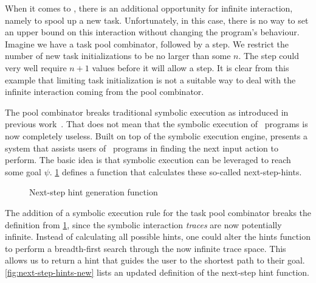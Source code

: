 When it comes to \DYNTOPHAT, there is an additional opportunity for infinite interaction, namely to spool up a new task.
Unfortunately, in this case, there is no way to set an upper bound on this interaction without changing the program's behaviour.
Imagine we have a task pool combinator, followed by a step.
We restrict the number of new task initializations to be no larger than some $n$.
The step could very well require $n+1$ values before it will allow a step.
It is clear from this example that limiting task initialization is not a suitable way to deal with the infinite interaction coming from the pool combinator.

The pool combinator breaks traditional symbolic execution as introduced in previous work~\cite{conf/ifl/NausSK19}.
That does not mean that the symbolic execution of \DYNTOPHAT\ programs is now completely useless.
Built on top of the symbolic execution engine, \citet{conf/sfp/NausS20} presents a system that assists users of \TOPHAT\ programs in finding the next input action to perform.
The basic idea is that symbolic execution can be leveraged to reach some goal $\psi$.
\cref{fig:next-step-hints} defines a function that calculates these so-called next-step-hints.

\begin{figure}
  \begin{mathpar}
  \end{mathpar}
  \caption{Next-step hint generation function}
  \label{fig:next-step-hints}
\end{figure}

The addition of a symbolic execution rule for the task pool combinator breaks the definition from \cref{fig:next-step-hints},
since the symbolic interaction \textit{traces} are now potentially infinite.
Instead of calculating all possible hints,
one could alter the hints function to perform a breadth-first search through the now infinite trace space.
This allows us to return a hint that guides the user to the shortest path to their goal.
\cref{fig:next-step-hints-new} lists an updated definition of the next-step hint function.

\begin{figure*}
  \begin{mathpar}
  \end{mathpar}
  \caption{Altered next-step hint generation function}
  \label{fig:next-step-hints-new}
\end{figure*}

